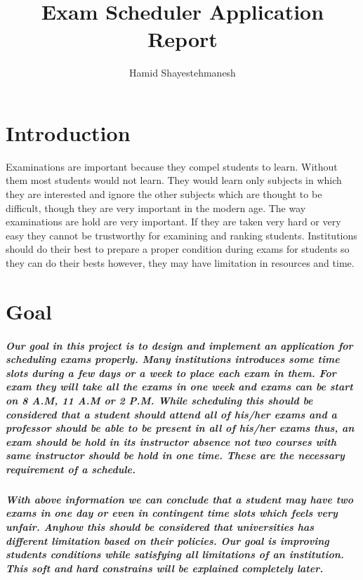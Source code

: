 \documentclass{report}
\begin{document}
\author{Hamid Shayestehmanesh}
\title{Exam Scheduler Application Report}
\maketitle
\tableofcontents
\newpage
\chapter{Introduction}
Examinations are important because they compel students to learn. Without them most students would not learn. They would learn only subjects in which they are interested and ignore the other subjects which are thought to be difficult, though they are very important in the modern age. 
\newline 
The way examinations are hold are very important. If they are taken very hard or very easy they cannot be trustworthy for examining and ranking students. Institutions should do their best to prepare a proper condition during exams for students so they can do their bests however, they may have limitation in resources and time.
\chapter{Goal}
\paragraph{Our goal in this project is to design and implement an application for scheduling exams properly. Many institutions introduces some time slots during a few days or a week to place each exam in them. For exam they will take all the exams in one week and exams can be start on 8 A.M, 11 A.M or 2 P.M. While scheduling this should be considered that a student should attend all of his/her exams and a professor should be able to be present in all of his/her exams thus, an exam should be hold in its instructor absence not two courses with same instructor should be hold in one time. These are the necessary requirement of a schedule.}
\paragraph{With above information we can conclude that a student may have two exams in one day or even in contingent time slots which feels very unfair. Anyhow this should be considered that universities has different limitation based on their policies. Our goal is improving students conditions while satisfying all limitations of an institution. This soft and hard constrains will be explained completely later.}
\end{document}
